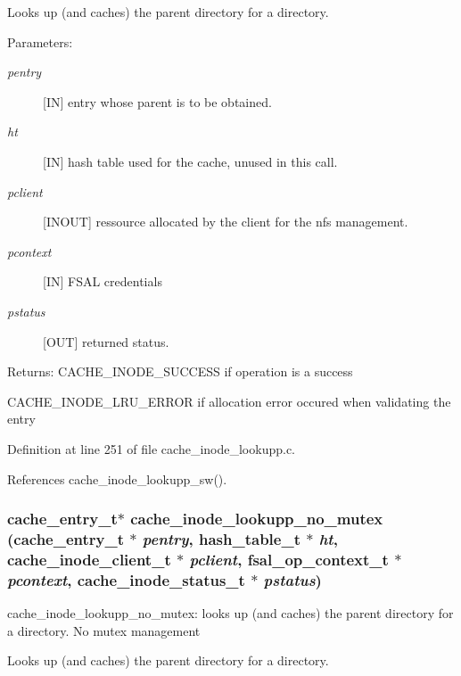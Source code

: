 Looks up (and caches) the parent directory for a directory.

\begin{Desc}
\item[Parameters:]
\begin{description}
\item[{\em pentry}][IN] entry whose parent is to be obtained. \item[{\em ht}][IN] hash table used for the cache, unused in this call. \item[{\em pclient}][INOUT] ressource allocated by the client for the nfs management. \item[{\em pcontext}][IN] FSAL credentials \item[{\em pstatus}][OUT] returned status.\end{description}
\end{Desc}
\begin{Desc}
\item[Returns:]CACHE\_\-INODE\_\-SUCCESS if operation is a success \par
 

CACHE\_\-INODE\_\-LRU\_\-ERROR if allocation error occured when validating the entry \end{Desc}


Definition at line 251 of file cache\_\-inode\_\-lookupp.c.

References cache\_\-inode\_\-lookupp\_\-sw().
\subsubsection{\setlength{\rightskip}{0pt plus 5cm}cache\_\-entry\_\-t$\ast$ cache\_\-inode\_\-lookupp\_\-no\_\-mutex (cache\_\-entry\_\-t $\ast$ {\em pentry}, hash\_\-table\_\-t $\ast$ {\em ht}, cache\_\-inode\_\-client\_\-t $\ast$ {\em pclient}, fsal\_\-op\_\-context\_\-t $\ast$ {\em pcontext}, cache\_\-inode\_\-status\_\-t $\ast$ {\em pstatus})}\label{cache__inode__lookupp_8c_a2}


cache\_\-inode\_\-lookupp\_\-no\_\-mutex: looks up (and caches) the parent directory for a directory. No mutex management

Looks up (and caches) the parent directory for a directory.

